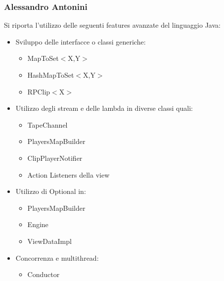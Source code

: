 \documentclass[a4paper,12pt]{report}
\begin{document}
\subsubsection{Alessandro Antonini}
Si riporta l’utilizzo delle seguenti features avanzate del linguaggio Java:
\begin{itemize}
    \item Sviluppo delle interfacce o classi generiche:
    \begin{itemize}
        \item MapToSet\begin{math}<\end{math}X,Y\begin{math}>\end{math}
        \item HashMapToSet\begin{math}<\end{math}X,Y\begin{math}>\end{math}
        \item RPClip\begin{math}<\end{math}X\begin{math}>\end{math}
    \end{itemize}
    \item Utilizzo degli stream e delle lambda in diverse classi quali:
    \begin{itemize}
        \item TapeChannel
        \item PlayersMapBuilder
        \item ClipPlayerNotifier
        \item Action Listeners della view
    \end{itemize}
    \item Utilizzo di Optional in: 
    \begin{itemize}
        \item PlayersMapBuilder
        \item Engine
        \item ViewDataImpl
    \end{itemize}
    \item Concorrenza e multithread:
    \begin{itemize}
        \item Conductor
    \end{itemize}
\end{itemize}
\end{document}
